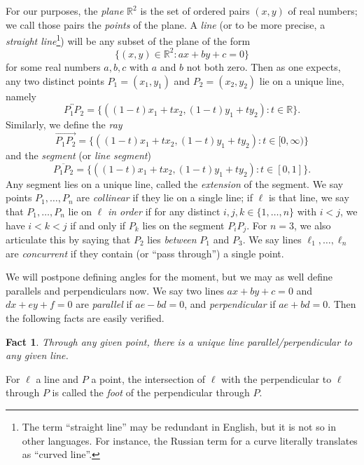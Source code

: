 \documentclass[12pt]{book}
\numberwithin{exc}{section}
\numberwithin{figure}{section}
\newtheorem{fact}[theorem]{Fact}
\numberwithin{equation}{theorem}
\newcommand{\RR}{\mathbb{R}}
\def\line#1{\overleftrightarrow{#1}}
\def\ray#1{\overrightarrow{#1}}
\def\seg#1{\overline{#1}}
\begin{document}
For our purposes, the \emph{plane} 
$\RR^2$ is the set of ordered pairs $(x,y)$ of real numbers; 
we call those pairs
the \emph{points}  of the plane. A \emph{line}
 (or to be more precise, a \emph{straight line}\footnote{The
term ``straight line'' may be redundant in English, but it is not so in
other languages. For instance, the Russian term for a curve
literally translates as ``curved line''.})
will be any subset of the plane of the form
\[
\{(x,y) \in \RR^2: ax + by + c = 0\}
\]
for some real numbers $a,b,c$ with $a$ and $b$ not both zero. Then as
one expects, any two distinct points $P_1 = (x_1, y_1)$ and $P_2 = (x_2, y_2)$
lie on a unique line, namely
\[
\line{P_1P_2} = \{ ((1-t)x_1 + tx_2, (1-t)y_1 + ty_2): t \in \RR \}.
\]
Similarly, we define the
\emph{ray} 
\[
\ray{P_1P_2} = \{ ((1-t)x_1 + tx_2, (1-t)y_1 + ty_2): t \in [0,\infty) \}
\]
and the \emph{segment} (or \emph{line segment})
 
\[
\seg{P_1P_2} = \{ ((1-t)x_1 + tx_2, (1-t)y_1 + ty_2): t \in [0,1] \}.
\]
Any segment lies on a unique line, called the \emph{extension}
 of the segment.
We say points $P_1, \dots, P_n$ are \emph{collinear} 
if they lie on a single line; if $\ell$ is that line, 
we say that $P_1, \dots, P_n$ lie on $\ell$ \emph{in order}
 if for any distinct
$i,j,k \in \{1, \dots,n\}$ with $i<j$, we have $i<k<j$ if and only if
$P_k$ lies on the segment $P_iP_j$. For $n=3$, we also articulate this
by saying that $P_2$ lies \emph{between}  $P_1$ and $P_3$.
We say lines $\ell_1, \dots, \ell_n$ are
\emph{concurrent}  if they contain (or
``pass through'') a single point.

We will postpone defining angles for the moment, but we may as well define
parallels and perpendiculars now. We say two lines $ax+by+c=0$ and $dx+ey+f=0$ are
\emph{parallel}  if $ae-bd = 0$, and
\emph{perpendicular} 
if $ae+bd = 0$. Then the following facts are easily
verified.
\begin{fact}
Through any given point, there is a unique line parallel/perpendicular to any
given line.
\end{fact}
For $\ell$ a line and $P$ a point, the intersection of $\ell$ with the
perpendicular to $\ell$ through $P$ is called the \emph{foot}
 of the perpendicular through $P$.
\end{document}
